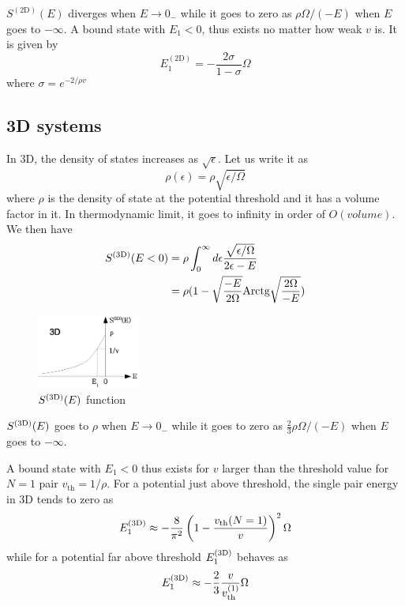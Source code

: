 \documentclass[aps,prb,showpacs,reprint]{revtex4-1}
\begin{document}
$S^{(\text{2D})}(E)$ diverges when $E\rightarrow{}0_{-}$ while it goes to zero as $\rho\Omega/(-E)$ when $E$ goes to $-\infty$. A bound state with $E_1<0$, thus exists no matter how weak $v$ is. It is given by 
\begin{equation}
E_1^{(\text{2D})}=-\frac{2\sigma}{1-\sigma}\Omega
\label{eq:}
\end{equation}
where $\sigma=e^{-2/\rho{v}}$



\subsection{3D systems}
In 3D, the density of states increases as $\sqrt{\epsilon}$. Let us write it as 
\begin{equation}
\rho(\epsilon)=\rho\sqrt{\epsilon/\Omega}
\label{eq:}
\end{equation}
where $\rho$ is the density of state at the potential threshold and it has a volume factor in it. In thermodynamic limit, it goes to infinity in order of $O(volume)$.  We then have
\begin{equation}
\begin{split}
S^{{\text{(3D)}}}(E<0)&=\rho\int_0^\infty{}d\epsilon\frac{\sqrt{\epsilon/\Omega}}{2\epsilon-E}\\
	&=\rho(1-\sqrt{\frac{-E}{2\Omega}}\text{Arctg}\sqrt{\frac{2\Omega}{-E}})
\label{eq:}
\end{split}
\end{equation}
\begin{figure}[htbp]
	\centering
		\includegraphics[width=0.30\textwidth]{3dOnePair.eps}
	\caption{$S^{{\text{(3D)}}}(E)$ function}
	\label{fig:3dOnePair}
\end{figure}

$S^{{\text{(3D)}}}(E)$ goes to $\rho$ when $E\rightarrow0_-$ while it goes to zero as $\frac{2}{3}\rho\Omega/(-E)$ when $E$ goes to $-\infty$. 

A bound state with $E_1<0$ thus exists for $v$ larger than the threshold value for $N=1$ pair $v_{\text{th}}=1/\rho$.  For a potential just above threshold, the single pair energy in 3D tends to zero as 
\begin{equation}
E_1^{{\text{(3D)}}}\approx-\frac{8}{\pi^2}\left(1-\frac{v_{\text{th}}(N=1)}{v}\right)^2\Omega
\label{eq:}
\end{equation}
while for a potential far above threshold $E_1^{{\text{(3D)}}}$ behaves as 
\begin{equation}
E_1^{{\text{(3D)}}}\approx-\frac{2}{3}\frac{v}{v_\text{th}^{\text{(1)}}}\Omega
\label{eq:}
\end{equation}
\end{document}
